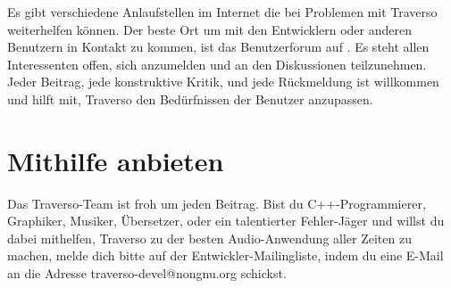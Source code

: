 Es gibt verschiedene Anlaufstellen im Internet die bei Problemen mit Traverso weiterhelfen können. Der beste Ort um mit den Entwicklern oder anderen Benutzern in Kontakt zu kommen, ist das Benutzerforum auf \cite{forum}. Es steht allen Interessenten offen, sich anzumelden und an den Diskussionen teilzunehmen. Jeder Beitrag, jede konstruktive Kritik, und jede Rückmeldung ist willkommen und hilft mit, Traverso den Bedürfnissen der Benutzer anzupassen.

\section{Mithilfe anbieten}
Das Traverso-Team ist froh um jeden Beitrag. Bist du C++-Programmierer, Graphiker, Musiker, Übersetzer, oder ein talentierter Fehler-Jäger und willst du dabei mithelfen, Traverso zu der besten Audio-Anwendung aller Zeiten zu machen, melde dich bitte auf der Entwickler-Mailingliste, indem du eine E-Mail an die Adresse traverso-devel@nongnu.org schickst.
